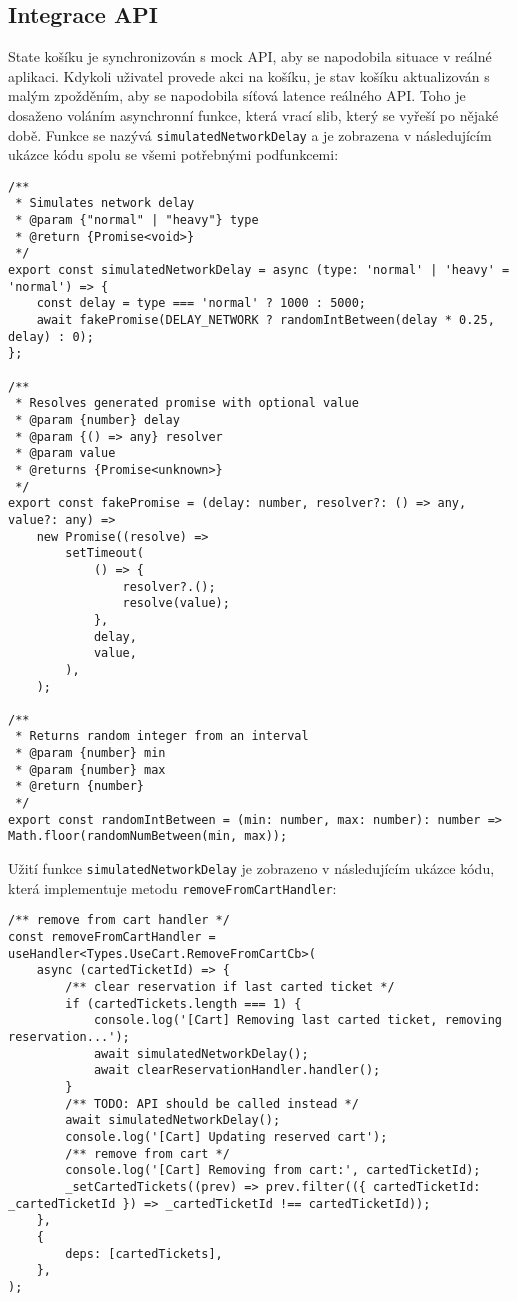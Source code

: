 \subsection{Integrace API}
\label{subsec:implementace-kosik-api}
State košíku je synchronizován s mock API, aby se napodobila situace v reálné aplikaci.
Kdykoli uživatel provede akci na košíku, je stav košíku aktualizován s malým zpožděním, aby se napodobila síťová latence reálného API.
Toho je dosaženo voláním asynchronní funkce, která vrací slib, který se vyřeší po nějaké době.
Funkce se nazývá \texttt{simulatedNetworkDelay} a je zobrazena v následujícím ukázce kódu spolu se všemi potřebnými podfunkcemi:

\begin{verbatim}
/**
 * Simulates network delay
 * @param {"normal" | "heavy"} type
 * @return {Promise<void>}
 */
export const simulatedNetworkDelay = async (type: 'normal' | 'heavy' = 'normal') => {
	const delay = type === 'normal' ? 1000 : 5000;
	await fakePromise(DELAY_NETWORK ? randomIntBetween(delay * 0.25, delay) : 0);
};

/**
 * Resolves generated promise with optional value
 * @param {number} delay
 * @param {() => any} resolver
 * @param value
 * @returns {Promise<unknown>}
 */
export const fakePromise = (delay: number, resolver?: () => any, value?: any) =>
	new Promise((resolve) =>
		setTimeout(
			() => {
				resolver?.();
				resolve(value);
			},
			delay,
			value,
		),
	);

/**
 * Returns random integer from an interval
 * @param {number} min
 * @param {number} max
 * @return {number}
 */
export const randomIntBetween = (min: number, max: number): number => Math.floor(randomNumBetween(min, max));
\end{verbatim}

Užití funkce \texttt{simulatedNetworkDelay} je zobrazeno v následujícím ukázce kódu, která implementuje metodu \texttt{removeFromCartHandler}:

\begin{verbatim}
/** remove from cart handler */
const removeFromCartHandler = useHandler<Types.UseCart.RemoveFromCartCb>(
	async (cartedTicketId) => {
		/** clear reservation if last carted ticket */
		if (cartedTickets.length === 1) {
			console.log('[Cart] Removing last carted ticket, removing reservation...');
			await simulatedNetworkDelay();
			await clearReservationHandler.handler();
		}
		/** TODO: API should be called instead */
		await simulatedNetworkDelay();
		console.log('[Cart] Updating reserved cart');
		/** remove from cart */
		console.log('[Cart] Removing from cart:', cartedTicketId);
		_setCartedTickets((prev) => prev.filter(({ cartedTicketId: _cartedTicketId }) => _cartedTicketId !== cartedTicketId));
	},
	{
		deps: [cartedTickets],
	},
);
\end{verbatim}

